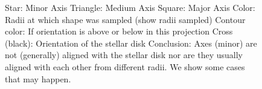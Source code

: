\documentclass[a4paper,fleqn,usenatbib]{mnras}
\begin{document}
\begin{figure}
  \centering
  \hfill
  \hfill
  \hfill
  \caption{Star: Minor Axis
    Triangle: Medium Axis
    Square: Major Axis
    Color: Radii at which shape was sampled (show radii sampled)
    Contour color: If orientation is above or below in this projection
    Cross (black): Orientation of the stellar disk
    Conclusion: Axes (minor) are not (generally) aligned with the
    stellar disk nor are they usually aligned with each other from
    different radii. We show some cases that may happen.} 
  \label{fig:alignment}
\end{figure}
\end{document}
